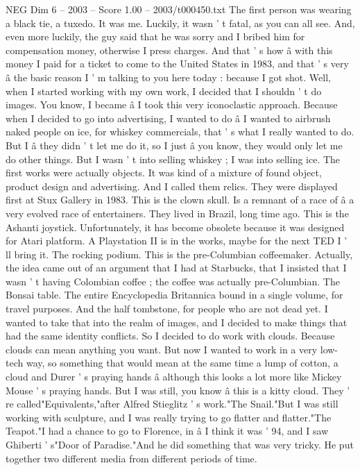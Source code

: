 \begin{textsample}{NEG Dim 6 – 2003 – Score 1.00 – 2003/t000450.txt}
The first person was wearing a black tie, a tuxedo.
It was me.
Luckily, it wasn ' t fatal, as you can all see.
And, even more luckily, the guy said that he was sorry and I bribed him for compensation money, otherwise I press charges.
And that ' s how â with this money I paid for a ticket to come to the United States in 1983, and that ' s very â the basic reason I ' m talking to you here today : because I got shot.
Well, when I started working with my own work, I decided that I shouldn ' t do images.
You know, I became â I took this very iconoclastic approach.
Because when I decided to go into advertising, I wanted to do â I wanted to airbrush naked people on ice, for whiskey commercials, that ' s what I really wanted to do.
But I â they didn ' t let me do it, so I just â you know, they would only let me do other things.
But I wasn ' t into selling whiskey ; I was into selling ice.
The first works were actually objects.
It was kind of a mixture of found object, product design and advertising.
And I called them relics.
They were displayed first at Stux Gallery in 1983.
This is the clown skull.
Is a remnant of a race of â a very evolved race of entertainers.
They lived in Brazil, long time ago.
This is the Ashanti joystick.
Unfortunately, it has become obsolete because it was designed for Atari platform.
A Playstation II is in the works, maybe for the next TED I ' ll bring it.
The rocking podium.
This is the pre-Columbian coffeemaker.
Actually, the idea came out of an argument that I had at Starbucks, that I insisted that I wasn ' t having Colombian coffee ; the coffee was actually pre-Columbian.
The Bonsai table.
The entire Encyclopedia Britannica bound in a single volume, for travel purposes.
And the half tombstone, for people who are not dead yet.
I wanted to take that into the realm of images, and I decided to make things that had the same identity conflicts.
So I decided to do work with clouds.
Because clouds can mean anything you want.
But now I wanted to work in a very low-tech way, so something that would mean at the same time a lump of cotton, a cloud and Durer ' s praying hands â although this looks a lot more like Mickey Mouse ' s praying hands.
But I was still, you know â this is a kitty cloud.
They ' re called"Equivalents,"after Alfred Stieglitz ' s work."The Snail."But I was still working with sculpture, and I was really trying to go flatter and flatter."The Teapot."I had a chance to go to Florence, in â I think it was ' 94, and I saw Ghiberti ' s"Door of Paradise."And he did something that was very tricky.
He put together two different media from different periods of time.

\end{textsample}
